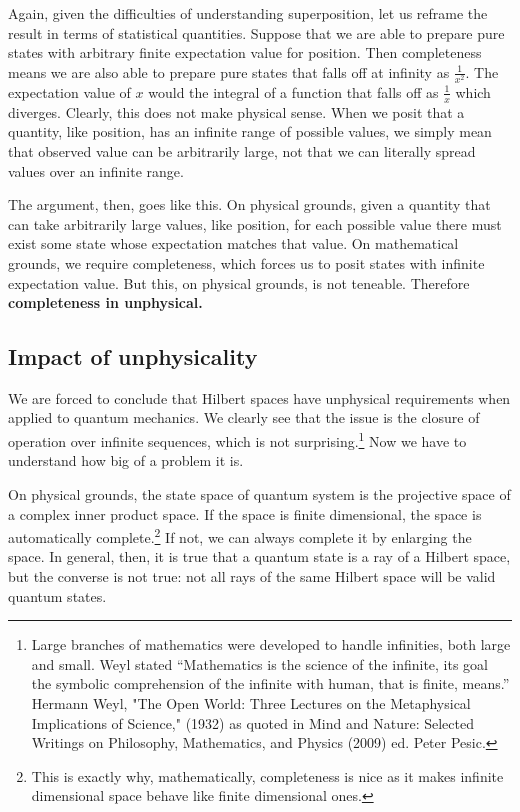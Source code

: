 \documentclass[10pt,twocolumn, nofootinbib]{revtex4-2}
\begin{document}
Again, given the difficulties of understanding superposition, let us reframe the result in terms of statistical quantities. Suppose that we are able to prepare pure states with arbitrary finite expectation value for position. Then completeness means we are also able to prepare pure states that falls off at infinity as $\frac{1}{x^2}$. The expectation value of $x$ would the integral of a function that falls off as $\frac{1}{x}$ which diverges. Clearly, this does not make physical sense. When we posit that a quantity, like position, has an infinite range of possible values, we simply mean that observed value can be arbitrarily large, not that we can literally spread values over an infinite range. 

The argument, then, goes like this. On physical grounds, given a quantity that can take arbitrarily large values, like position, for each possible value there must exist some state whose expectation matches that value. On mathematical grounds, we require completeness, which forces us to posit states with infinite expectation value. But this, on physical grounds, is not teneable. Therefore \textbf{completeness in unphysical.}

\subsection{Impact of unphysicality}

We are forced to conclude that Hilbert spaces have unphysical requirements when applied to quantum mechanics. We clearly see that the issue is the closure of operation over infinite sequences, which is not surprising.\footnote{Large branches of mathematics were developed to handle infinities, both large and small. Weyl stated ``Mathematics is the science of the infinite, its goal the symbolic comprehension of the infinite with human, that is finite, means.'' Hermann Weyl, "The Open World: Three Lectures on the Metaphysical Implications of Science," (1932) as quoted in Mind and Nature: Selected Writings on Philosophy, Mathematics, and Physics (2009) ed. Peter Pesic.} Now we have to understand how big of a problem it is.

On physical grounds, the state space of quantum system is the projective space of a complex inner product space. If the space is finite dimensional, the space is automatically complete.\footnote{This is exactly why, mathematically, completeness is nice as it makes infinite dimensional space behave like finite dimensional ones.} If not, we can always complete it by enlarging the space. In general, then, it is true that a quantum state is a ray of a Hilbert space, but the converse is not true: not all rays of the same Hilbert space will be valid quantum states.
\end{document}
